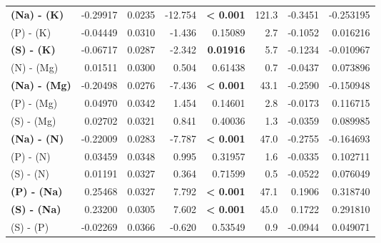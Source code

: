 \begin{table}[H]
\begin{tabular}[t]{>{}lrrr>{}rrrr}
\textbf{(Na) - (K)} & -0.29917 & 0.0235 & -12.754 & \textbf{< 0.001} & 121.3 & -0.3451 & -0.253195\\
(P) - (K) & -0.04449 & 0.0310 & -1.436 & 0.15089 & 2.7 & -0.1052 & 0.016216\\
\textbf{(S) - (K)} & -0.06717 & 0.0287 & -2.342 & \textbf{0.01916} & 5.7 & -0.1234 & -0.010967\\
(N) - (Mg) & 0.01511 & 0.0300 & 0.504 & 0.61438 & 0.7 & -0.0437 & 0.073896\\
\textbf{(Na) - (Mg)} & -0.20498 & 0.0276 & -7.436 & \textbf{< 0.001} & 43.1 & -0.2590 & -0.150948\\
(P) - (Mg) & 0.04970 & 0.0342 & 1.454 & 0.14601 & 2.8 & -0.0173 & 0.116715\\
(S) - (Mg) & 0.02702 & 0.0321 & 0.841 & 0.40036 & 1.3 & -0.0359 & 0.089985\\
\textbf{(Na) - (N)} & -0.22009 & 0.0283 & -7.787 & \textbf{< 0.001} & 47.0 & -0.2755 & -0.164693\\
(P) - (N) & 0.03459 & 0.0348 & 0.995 & 0.31957 & 1.6 & -0.0335 & 0.102711\\
(S) - (N) & 0.01191 & 0.0327 & 0.364 & 0.71599 & 0.5 & -0.0522 & 0.076049\\
\textbf{(P) - (Na)} & 0.25468 & 0.0327 & 7.792 & \textbf{< 0.001} & 47.1 & 0.1906 & 0.318740\\
\textbf{(S) - (Na)} & 0.23200 & 0.0305 & 7.602 & \textbf{< 0.001} & 45.0 & 0.1722 & 0.291810\\
(S) - (P) & -0.02269 & 0.0366 & -0.620 & 0.53549 & 0.9 & -0.0944 & 0.049071\\
\bottomrule
\end{tabular}
\end{table}
